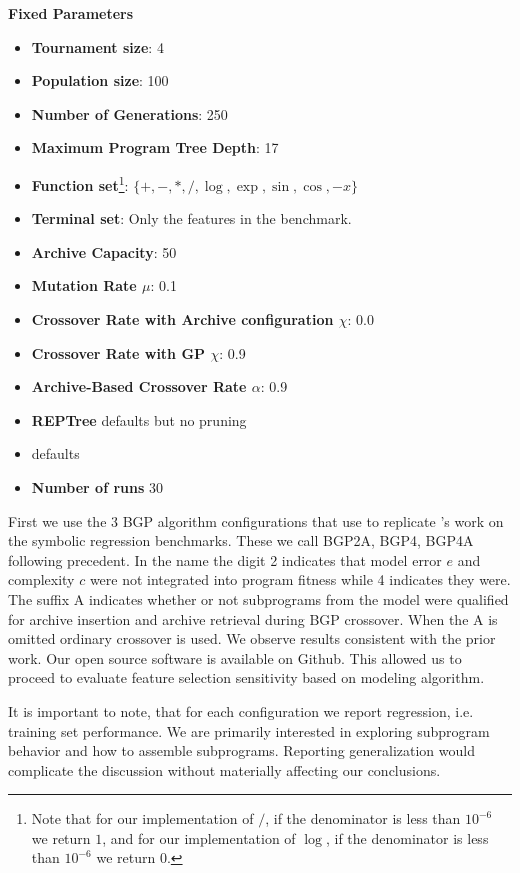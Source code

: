\textbf{Fixed Parameters}\label{appendix:fixed_parameters}
\begin{itemize}
\item \textbf{Tournament size}: 4
\item \textbf{Population size}: 100
\item \textbf{Number of Generations}: 250
\item \textbf{Maximum Program Tree Depth}: 17
\item \textbf{Function set}\footnote{Note that for our implementation of $/$, if the denominator is less than $10^{-6}$ we return $1$, and for our implementation of $\log$, if the denominator is less than $10^{-6}$ we return $0$.}: $\{ +, -, *, /, \log, \exp, \sin, \cos, -x \}$
\item \textbf{Terminal set}: Only the features in the benchmark.
\item \textbf{Archive Capacity}: 50
\item \textbf{Mutation Rate $\mu$}: 0.1
\item \textbf{Crossover Rate with Archive configuration $\chi$}: 0.0
\item \textbf{Crossover Rate with GP $\chi$}: 0.9
\item \textbf{Archive-Based Crossover Rate $\alpha$}: 0.9
\item \textbf{REPTree}  defaults but no pruning
\item \textbf{\SCIKIT} defaults
\item \textbf{Number of runs} 30
\end{itemize}

First we use the 3 BGP algorithm configurations that use \REPTREE to replicate \cite{krawiecGecco2014}'s work on the symbolic regression benchmarks. These we call BGP2A, BGP4, BGP4A following precedent. In the name the digit 2 indicates that model error $e$ and complexity $c$ were not integrated into program fitness while 4 indicates they were.   The suffix A indicates whether or not subprograms from the model were qualified for archive insertion and archive retrieval during BGP crossover. When the A is omitted ordinary crossover is used. We observe results consistent with the prior work. Our open source software is available on Github.
This allowed us to proceed to evaluate feature selection sensitivity based on modeling algorithm.

It is important to note, that for each configuration we report regression, i.e. training set performance. We are primarily interested in exploring subprogram behavior and how to assemble subprograms. Reporting generalization would complicate the discussion without materially affecting our conclusions. 

